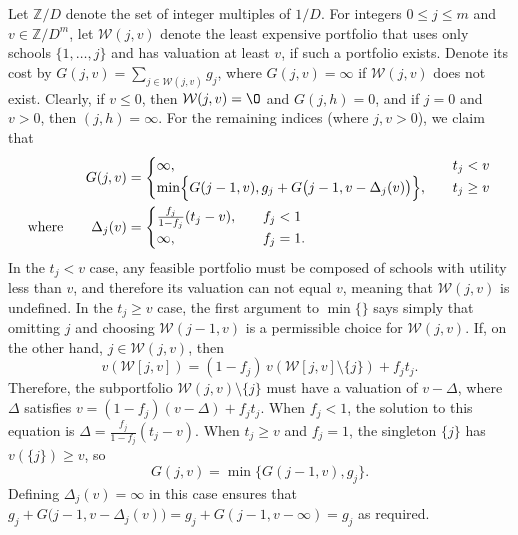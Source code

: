 Let $\mathbb{Z}/D$ denote the set of integer multiples of $1/D$. For integers $0 \leq j \leq m$ and $v \in \mathbb{Z}/{D^m}$, let $\mathcal{W}(j, v)$ denote the least expensive portfolio that uses only schools $\{ 1, \dots, j\}$ and has valuation at least $v$, if such a portfolio exists. Denote its cost by $G(j, v) = \sum_{j\in \mathcal{W}(j, v)} g_j$, where $G(j, v) = \infty$ if $\mathcal{W}(j, v)$ does not exist. Clearly, if $v \leq 0$, then $\mathcal{W}(j, v) = \O$ and $G(j, h) = 0$, and if $j = 0$ and $v > 0$, then $(j, h) = \infty$.  For the remaining indices (where $j, v > 0$), we claim that
\begin{align} \label{recursionrelationforcostmindp}
G(j, v) &=
\begin{cases}
\infty, \quad & t_j < v \\
\min\Bigl\{G(j-1, v), g_j + G\bigl(j-1, v - \Delta_j(v)\bigr) \Bigr\}, \quad & t_j \geq v 
\end{cases}\\
\text{where}\qquad
\Delta_j (v) &= 
\begin{cases}
\frac{f_j}{1 - f_j} (t_j - v), \quad & f_j < 1\\
\infty, &f_j = 1.
\end{cases} \label{deltajvdef}
\end{align}
In the $t_j < v$ case, any feasible portfolio must be composed of schools with utility less than $v$, and therefore its valuation can not equal $v$, meaning that $\mathcal{W}(j, v)$ is undefined. In the $t_j \geq v$ case, the first argument to $\min\{\}$ says simply that omitting $j$ and choosing $\mathcal{W}(j-1, v)$ is a permissible choice for $\mathcal{W}(j, v)$. If, on the other hand, $j \in \mathcal{W}(j, v)$, then
\begin{equation} \label{solvemeforvwjvminusj}
v(\mathcal{W}[j, v]) = (1 - f_j )\,v(\mathcal{W}[j, v]\setminus \{j\}) + f_j t_j.
\end{equation}
Therefore, the subportfolio $\mathcal{W}(j, v)\setminus \{j\}$ must have a valuation of $v - \Delta$, where $\Delta$ satisfies $v = (1 - f_j )(v - \Delta) + f_j t_j $. When $f_j < 1$, the solution to this equation is $ \Delta = \frac{f_j}{1 - f_j} (t_j - v)$. When $t_j \geq v$ and $f_j = 1$, the singleton $\{j\}$ has $v(\{j\}) \geq v$, so
\begin{equation}G(j, v) = \min\bigl\{G(j-1, v), g_j \bigr\}.\end{equation}
Defining $\Delta_j(v) = \infty$ in this case ensures that $g_j + G\bigl(j-1, v-\Delta_j(v)\bigr) = g_j+ G(j-1, v-\infty) = g_j $ as required.

